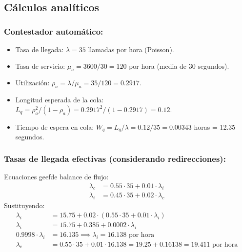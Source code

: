 \documentclass[12pt]{article}
\begin{document}
\subsection{Cálculos analíticos}

\subsubsection{Contestador automático:}
\begin{itemize}
    \item Tasa de llegada: $\lambda = 35$ llamadas por hora (Poisson).
    \item Tasa de servicio: $\mu_a = 3600/30 = 120$ por hora (media de 30 segundos).
    \item Utilización: $\rho_a = \lambda/\mu_a = 35/120 = 0.2917$.
    \item Longitud esperada de la cola: $L_q = \rho_a^2/(1 - \rho_a) = 0.2917^2/(1 - 0.2917) = 0.12$.
    \item Tiempo de espera en cola: $W_q = L_q/\lambda = 0.12/35 = 0.00343$ horas = 12.35 segundos.
\end{itemize}

\subsubsection{Tasas de llegada efectivas (considerando redirecciones):}
Ecuaciones geefde balance de flujo:
\begin{align*}
    \lambda_c &= 0.55 \cdot 35 + 0.01 \cdot \lambda_i \\
    \lambda_i &= 0.45 \cdot 35 + 0.02 \cdot \lambda_c
\end{align*}
Sustituyendo:
\begin{align*}
    \lambda_i &= 15.75 + 0.02 \cdot (0.55 \cdot 35 + 0.01 \cdot \lambda_i) \\
    \lambda_i &= 15.75 + 0.385 + 0.0002 \cdot \lambda_i \\
    0.9998 \cdot \lambda_i &= 16.135 \implies \lambda_i = 16.138 \text{ por hora} \\
    \lambda_c &= 0.55 \cdot 35 + 0.01 \cdot 16.138 = 19.25 + 0.16138 = 19.411 \text{ por hora}
\end{align*}
\end{document}
